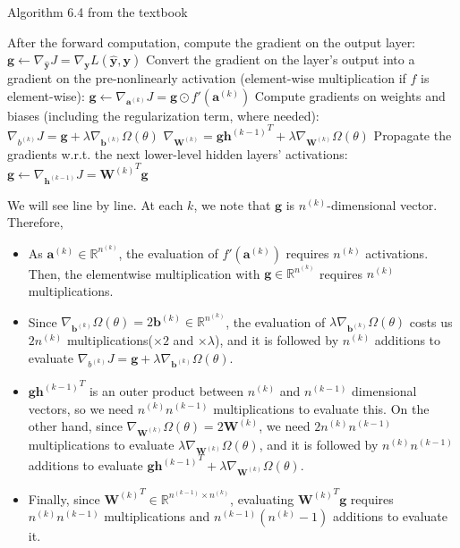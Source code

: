 \documentclass[
	12pt, %
]{../Template/fphw}
\renewcommand{\b}{\mathbf{b}}
\newcommand{\y}{\mathbf{y}}
\newcommand{\h}{\mathbf{h}}
\renewcommand{\a}{\mathbf{a}}
\newcommand{\W}{\mathbf{W}}
\newcommand{\g}{\mathbf{g}}
\begin{document}
\begin{enumerate}[label=(\arabic*)]
\begin{algorithm}
    \caption{Algorithm 6.4 from the textbook}\label{alg:6.4}
    \begin{algorithmic}
        \State After the forward computation, compute the gradient on the output layer:
        \State $\g \leftarrow \nabla_{\hat{\y}} J = \nabla_{\y}L(\hat{\y},\y)$
        \State Convert the gradient on the layer's output into a gradient on the pre-nonlinearly activation (element-wise multiplication if $f$ is element-wise):
        \State $\g \leftarrow \nabla_{\a^{(k)}}J = \g\odot f'(\a^{(k)})$
        \State Compute gradients on weights and biases (including the regularization term, where needed):
        \State $\nabla_{b^{(k)}} J = \g + \lambda \nabla_{\b^{(k)}} \Omega (\theta)$ 
        \State $\nabla_{\W^{(k)}} = \g {\h^{(k-1)}}^T + \lambda \nabla_{\W^{(k)}}\Omega (\theta)$
        \State Propagate the gradients w.r.t. the next lower-level hidden layers' activations:
        \State $\g\leftarrow \nabla_{\h^{(k-1)}}J = {\W^{(k)}}^{T} \g$
        \EndFor
    \end{algorithmic}
\end{algorithm}
 We will see line by line. At each $k$, we note that $\g$ is $n^{(k)}$-dimensional vector. Therefore,
\begin{itemize}
    \item As $\a^{(k)}\in \mathbb{R}^{n^{(k)}}$, the evaluation of $f'(\a^{(k)})$ requires $n^{(k)}$ activations. Then, the elementwise multiplication with $\g \in \mathbb{R}^{n^{(k)}}$ requires $n^{(k)}$ multiplications. 
    \item Since $\nabla_{\b^{(k)}}\Omega (\theta) = 2\b^{(k)}\in \mathbb{R}^{n^{(k)}}$, the evaluation of $\lambda \nabla_{\b^{(k)}} \Omega (\theta)$ costs us $2n^{(k)}$ multiplications($\times 2$ and $\times \lambda$), and it is followed by $n^{(k)}$ additions to evaluate $\nabla_{b^{(k)}} J = \g + \lambda \nabla_{\b^{(k)}} \Omega (\theta)$.
    \item $\g {\h^{(k-1)}}^T$ is an outer product between $n^{(k)}$ and $n^{(k-1)}$ dimensional vectors, so we need $n^{(k)}n^{(k-1)}$ multiplications to evaluate this. On the other hand, since $\nabla_{\W^{(k)}}\Omega (\theta) = 2 \W^{(k)}$, we need $2n^{(k)}n^{(k-1)}$ multiplications to evaluate $\lambda \nabla_{\W^{(k)}}\Omega (\theta)$, and it is followed by $n^{(k)}n^{(k-1)}$ additions to evaluate $\g {\h^{(k-1)}}^T + \lambda \nabla_{\W^{(k)}}\Omega (\theta)$.
    \item Finally, since ${\W^{(k)}}^T\in \mathbb{R}^{n^{(k-1)}\times n^{(k)}}$, evaluating ${\W^{(k)}}^{T} \g$ requires $n^{(k)}n^{(k-1)}$ multiplications and $n^{(k-1)}(n^{(k)}-1)$ additions to evaluate it.

\end{itemize}
\end{enumerate}
\end{document}

